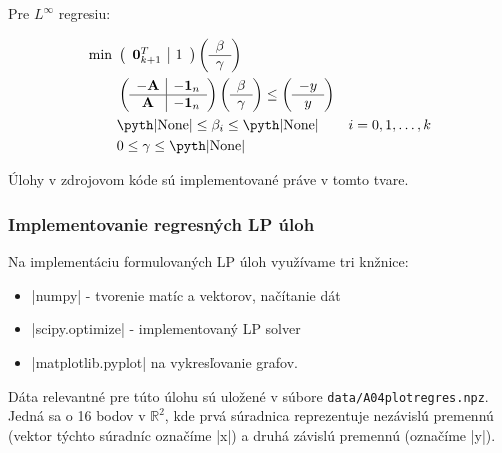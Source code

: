 \documentclass[report.tex]{subfiles}
\begin{document}
Pre $L^{\infty}$ regresiu:

\begin{align*}
	\text{min}~ &
	\left(
	\begin{array}{c|c}
		\mathbf{0}_{k+1}^T & 1
	\end{array}
	\right)
	\left(
	\begin{array}{c}
		\beta \\
		\hline
		\gamma
	\end{array}
	\right) \\
	&\left(
	\begin{array}{c|c}
		-\mathbf{A} & -\mathbf{1}_n \\
		\hline
		\mathbf{A} & -\mathbf{1}_n
	\end{array}
	\right)
	\left(
	\begin{array}{c}
		\beta \\
		\hline
		\gamma
	\end{array}
	\right)
	\leq
	\left(
	\begin{array}{c}
		-y \\
		\hline
		y
	\end{array}
	\right) \\
	&\text{\pyth|None|} \leq \beta_i \leq \text{\pyth|None|} &i = 0,1,\dots,k\\
	&0 \leq \gamma \leq \text{\pyth|None|}
\end{align*}

Úlohy v zdrojovom kóde sú implementované práve v tomto tvare.

\subsubsection{Implementovanie regresných LP úloh}

Na implementáciu formulovaných LP úloh využívame tri knžnice:

\begin{itemize}
	\item \pyth|numpy| - tvorenie matíc a vektorov, načítanie dát
	\item \pyth|scipy.optimize| - implementovaný LP solver
	\item \pyth|matplotlib.pyplot| na vykresľovanie grafov.
\end{itemize}

Dáta relevantné pre túto úlohu sú uložené v súbore \verb|data/A04plotregres.npz|. Jedná sa o 16 bodov v $\mathbb{R}^2$, kde prvá súradnica reprezentuje nezávislú premennú (vektor týchto súradníc označíme \pyth|x|) a druhá závislú premennú (označíme \pyth|y|). 
\end{document}
